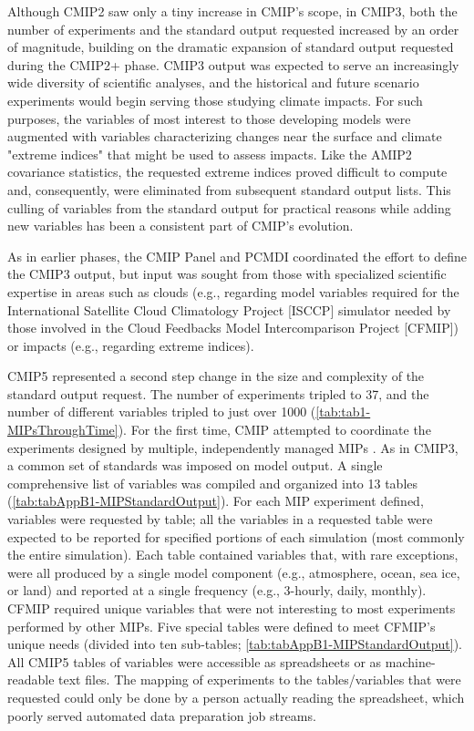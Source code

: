 \documentclass[gmd, preprint]{copernicus}
\begin{document}
Although CMIP2 saw only a tiny increase in CMIP's scope, in CMIP3, both the number of experiments and the standard output requested increased by an order of magnitude, building on the dramatic expansion of standard output requested during the CMIP2+ phase. CMIP3 output was expected to serve an increasingly wide diversity of scientific analyses, and the historical and future scenario experiments would begin serving those studying climate impacts. For such purposes, the variables of most interest to those developing models were augmented with variables characterizing changes near the surface and climate "extreme indices" that might be used to assess impacts. Like the AMIP2 covariance statistics, the requested extreme indices proved difficult to compute and, consequently, were eliminated from subsequent standard output lists. This culling of variables from the standard output for practical reasons while adding new variables has been a consistent part of CMIP's evolution.

As in earlier phases, the CMIP Panel and PCMDI coordinated the effort to define the CMIP3 output, but input was sought from those with specialized scientific expertise in areas such as clouds (e.g., regarding model variables required for the International Satellite Cloud Climatology Project [ISCCP] simulator needed by those involved in the Cloud Feedbacks Model Intercomparison Project [CFMIP]) or impacts (e.g., regarding extreme indices).

CMIP5 represented a second step change in the size and complexity of the standard output request. The number of experiments tripled to 37, and the number of different variables tripled to just over 1000 (\autoref{tab:tab1-MIPsThroughTime}). For the first time, CMIP attempted to coordinate the experiments designed by multiple, independently managed MIPs \citep[even though in the overview paper, all experiments were identified by the phase only,][]{taylor_overview_2012}. As in CMIP3, a common set of standards was imposed on model output. A single comprehensive list of variables was compiled and organized into 13 tables (\autoref{tab:tabAppB1-MIPStandardOutput}). For each MIP experiment defined, variables were requested by table; all the variables in a requested table were expected to be reported for specified portions of each simulation (most commonly the entire simulation). Each table contained variables that, with rare exceptions, were all produced by a single model component (e.g., atmosphere, ocean, sea ice, or land) and reported at a single frequency (e.g., 3-hourly, daily, monthly). CFMIP required unique variables that were not interesting to most experiments performed by other MIPs. Five special tables were defined to meet CFMIP's unique needs (divided into ten sub-tables; \autoref{tab:tabAppB1-MIPStandardOutput}). All CMIP5 tables of variables were accessible as spreadsheets or as machine-readable text files. The mapping of experiments to the tables/variables that were requested could only be done by a person actually reading the spreadsheet, which poorly served automated data preparation job streams.
\end{document}

